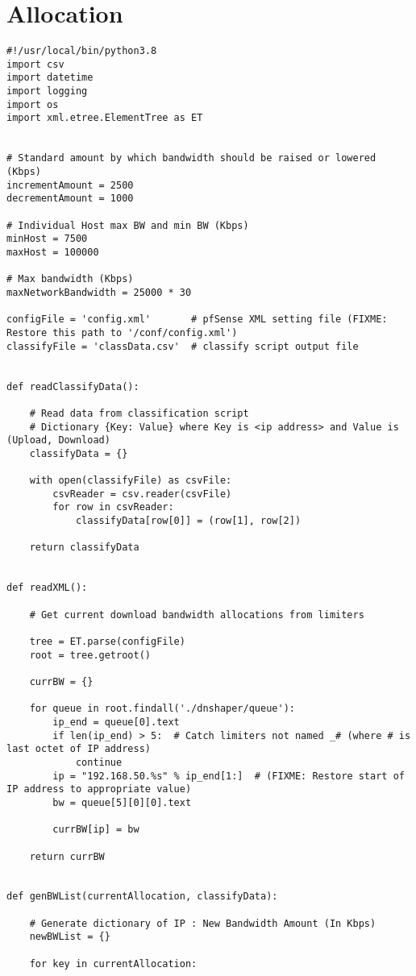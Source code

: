 \section{Allocation}
\begin{verbatim}
#!/usr/local/bin/python3.8
import csv
import datetime
import logging
import os
import xml.etree.ElementTree as ET


# Standard amount by which bandwidth should be raised or lowered (Kbps)
incrementAmount = 2500
decrementAmount = 1000

# Individual Host max BW and min BW (Kbps)
minHost = 7500
maxHost = 100000

# Max bandwidth (Kbps)
maxNetworkBandwidth = 25000 * 30

configFile = 'config.xml'       # pfSense XML setting file (FIXME: Restore this path to '/conf/config.xml')
classifyFile = 'classData.csv'  # classify script output file


def readClassifyData():

    # Read data from classification script
    # Dictionary {Key: Value} where Key is <ip address> and Value is (Upload, Download)
    classifyData = {}

    with open(classifyFile) as csvFile:
        csvReader = csv.reader(csvFile)
        for row in csvReader:
            classifyData[row[0]] = (row[1], row[2])

    return classifyData


def readXML():

    # Get current download bandwidth allocations from limiters

    tree = ET.parse(configFile)
    root = tree.getroot()

    currBW = {}

    for queue in root.findall('./dnshaper/queue'):
        ip_end = queue[0].text
        if len(ip_end) > 5:  # Catch limiters not named _# (where # is last octet of IP address)
            continue
        ip = "192.168.50.%s" % ip_end[1:]  # (FIXME: Restore start of IP address to appropriate value)
        bw = queue[5][0][0].text

        currBW[ip] = bw

    return currBW


def genBWList(currentAllocation, classifyData):

    # Generate dictionary of IP : New Bandwidth Amount (In Kbps)
    newBWList = {}

    for key in currentAllocation:


\end{verbatim}
